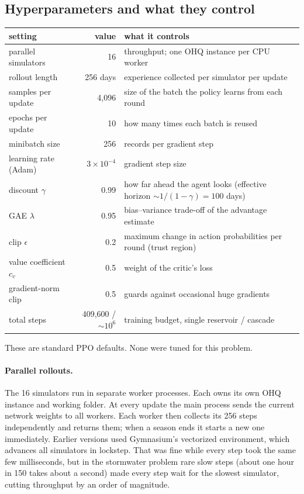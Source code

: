 \subsection{Hyperparameters and what they control}
\begin{center}
\small
\begin{tabular}{lrp{}}
\toprule
setting & value & what it controls\\
\midrule
parallel simulators & 16 & throughput; one OHQ instance per CPU worker\\
rollout length & 256 days & experience collected per simulator per update\\
samples per update & 4{,}096 & size of the batch the policy learns from each round\\
epochs per update & 10 & how many times each batch is reused\\
minibatch size & 256 & records per gradient step\\
learning rate (Adam) & $3\times10^{-4}$ & gradient step size\\
discount $\gamma$ & 0.99 & how far ahead the agent looks (effective horizon $\sim1/(1-\gamma)=100$ days)\\
GAE $\lambda$ & 0.95 & bias--variance trade-off of the advantage estimate\\
clip $\epsilon$ & 0.2 & maximum change in action probabilities per round (trust region)\\
value coefficient $c_v$ & 0.5 & weight of the critic's loss\\
gradient-norm clip & 0.5 & guards against occasional huge gradients\\
total steps & 409{,}600 / $\sim10^6$ & training budget, single reservoir / cascade\\
\bottomrule
\end{tabular}
\end{center}
These are standard PPO defaults. None were tuned for this problem.

\paragraph{Parallel rollouts.} The 16 simulators run in separate worker
processes. Each owns its own OHQ instance and working folder. At every
update the main process sends the current network weights to all workers.
Each worker then collects its 256 steps independently and returns them;
when a season ends it starts a new one immediately. Earlier versions used
Gymnasium's vectorized environment, which advances all simulators in
lockstep. That was fine while every step took the same few milliseconds,
but in the stormwater problem rare slow steps (about one hour in 150 takes
about a second) made every step wait for the slowest simulator, cutting
throughput by an order of magnitude.

